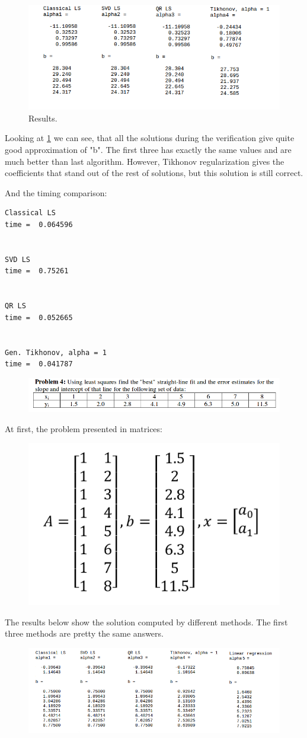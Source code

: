 \documentclass[eng,openany]{mgr}
\begin{document}
\begin{figure}[h]
\centering
\includegraphics[width=0.7\linewidth]{screenshot008}
\caption{Results.}
\label{fig:screenshot008}
\end{figure}
Looking at \ref{fig:screenshot008} we can see, that all the solutions during the verification give quite good approximation of "b". The first three has exactly the same values and are much better than last algorithm. However, Tikhonov regularization gives the coefficients that stand out of the rest of solutions, but this solution is still correct.

And the timing comparison:
\begin{lstlisting}
Classical LS
time =  0.064596


SVD LS
time =  0.75261


QR LS
time =  0.052665


Gen. Tikhonov, alpha = 1
time =  0.041787
\end{lstlisting}
\newpage
\begin{figure}[h]
\centering
\includegraphics[width=0.7\linewidth]{screenshot009}
\label{fig:screenshot009}
\end{figure}
At first, the problem presented in matrices:
\begin{figure}[h]
\centering
\includegraphics[width=0.35\linewidth]{screenshot010}
\label{fig:screenshot010}
\end{figure}
The results below show the solution computed by different methods. The first three methods are pretty the same answers.
\begin{figure}[h]
\centering
\includegraphics[width=0.8\linewidth]{screenshot011}
\label{fig:screenshot011}
\end{figure}
\end{document}

